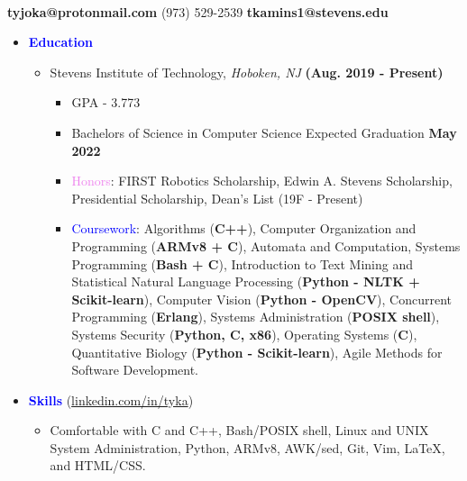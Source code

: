 \documentclass[11pt]{article}
\begin{document}
\begin{flushleft}

    \makebox[\textwidth]{\LARGE \textbf{\textcolor{teal}{Tyler Kaminski}}}\\

\setlength{\parindent}{0.5in}

\begin{multicols}{2}
    \textbf{tyjoka@protonmail.com} \textemdash{} (973) 529-2539
    \textbf{tkamins1@stevens.edu}
\end{multicols}

\begin{itemize}
    \item[] \Large \textcolor{blue}{\textbf{Education}} \normalsize
        \begin{itemize}
            \item Stevens Institute of Technology, \textit{Hoboken, NJ}  \hfill{\textbf{(Aug. 2019 - Present)}}
                \begin{itemize}
                    \item GPA - 3.773
                    \item Bachelors of Science in Computer Science \hfill{Expected Graduation \textbf{May 2022}}
					\item \textcolor{violet}{Honors}: FIRST Robotics Scholarship, Edwin A. Stevens Scholarship, Presidential Scholarship, Dean’s List (19F - Present)
                    \item \textcolor{blue}{Coursework}: Algorithms (\textbf{C++}), Computer Organization and Programming (\textbf{ARMv8 + C}), Automata and Computation, Systems Programming (\textbf{Bash + C}), Introduction to Text Mining and Statistical Natural Language Processing (\textbf{Python - NLTK + Scikit-learn}), Computer Vision (\textbf{Python - OpenCV}), Concurrent Programming (\textbf{Erlang}), Systems Administration (\textbf{POSIX shell}), Systems Security (\textbf{Python, C, x86}), Operating Systems (\textbf{C}), Quantitative Biology (\textbf{Python - Scikit-learn}), Agile Methods for Software Development.
                \end{itemize}
        \end{itemize}
	\item[] \Large \textcolor{blue}{\textbf{Skills}} (\url{linkedin.com/in/tyka}) \normalsize
        \begin{itemize}
            \item Comfortable with C and C++, Bash/POSIX shell, Linux and UNIX System Administration, Python, ARMv8, AWK/sed, Git, Vim, LaTeX, and HTML/CSS.

\end{itemize}
\end{itemize}
\end{flushleft}
\end{document}

